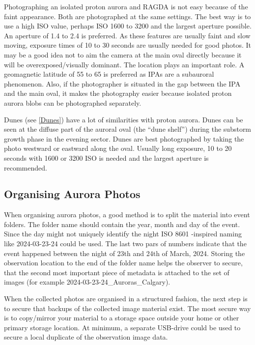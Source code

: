 \documentclass{article}
\begin{document}
Photographing an isolated proton aurora and RAGDA is not easy because of the faint appearance. Both are photographed at the same settings. The best way is to use a high ISO value, perhaps ISO 1600 to 3200 and the largest aperture possible. An aperture of 1.4 to 2.4 is preferred. As these features are usually faint and slow moving, exposure times of 10 to 30 seconds are usually needed for good photos. It may be a good idea not to aim the camera at the main oval directly because it will be overexposed/visually dominant. The location plays an important role. A geomagnetic latitude of 55 to 65 is preferred as IPAs are a subauroral phenomenon. Also, if the photographer is situated in the gap between the IPA and the main oval, it makes the photography easier because isolated proton aurora blobs can be photographed separately.

Dunes (see \ref{Dunes}) have a lot of similarities with proton aurora. Dunes can be seen at the diffuse part of the auroral oval (the ``dune shelf'') during the substorm growth phase in the evening sector. Dunes are best photographed by taking the photo westward or eastward along the oval. Usually long exposure, 10 to 20 seconds with 1600 or 3200 ISO is needed and the largest aperture is recommended.


\subsection{Organising Aurora Photos}\label{sec:data_cit_storage}

When organising aurora photos, a good method is to split the material into event folders. The folder name should contain the year, month and day of the event. Since the day might not uniquely identify the night ISO 8601 -inspired naming like 2024-03-23-24 could be used. The last two pars of numbers indicate that the event happened between the night of 23th and 24th of March, 2024. Storing the observation location to the end of the folder name helps the observer to secure, that the second most important piece of metadata is attached to the set of images (for example 2024-03-23-24\_Auroras\_Calgary).

When the collected photos are organised in a structured fashion, the next step is to secure that backups of the collected image material exist. The most secure way is to copy/mirror your material to a storage space outside your home or other primary storage location. At minimum, a separate USB-drive could be used to secure a local duplicate of the observation image data.
\end{document}
